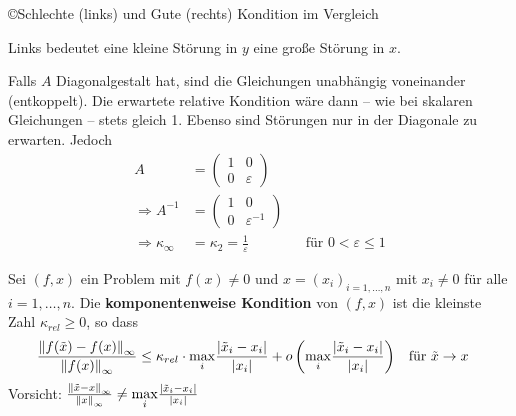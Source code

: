 \begin{Bspe}
\begin{image}{\copyright Schlechte (links) und Gute (rechts)
      Kondition im Vergleich}
    Links bedeutet eine kleine Störung in $y$ eine große Störung in $x$.
  \end{image}
\end{Bspe}



\begin{Bspe}
  Falls $A$ Diagonalgestalt hat, sind die Gleichungen 
  unabhängig voneinander (entkoppelt).
  Die erwartete relative Kondition wäre dann 
  – wie bei skalaren Gleichungen – stets gleich 1.
  Ebenso sind Störungen nur in der Diagonale zu erwarten. Jedoch
  \begin{align*}
    A  &=\begin{pmatrix}
      1 & 0\\
      0 & \varepsilon
    \end{pmatrix} \\
    \Rightarrow 	A^{-1}&=\begin{pmatrix}
      1 & 0\\
      0 & \varepsilon^{-1}
    \end{pmatrix}\\
    \Rightarrow \kappa_\infty& = \kappa_2 = \frac{1}{\varepsilon} 
        && \text{für }0 < \varepsilon \leq 1
  \end{align*}
\end{Bspe}

\begin{Defe}
  Sei $(f, x) $ ein Problem mit $f(x)\neq 0$ 
  und $x=(x_i)_{i=1,\dotsc , n}$ mit $x_i\neq 0 $  für alle $i=1,\dotsc, n$.
  Die \textbf{komponentenweise Kondition} von $(f,x)$
  ist die kleinste Zahl $\kappa_{rel}\geq 0$, so dass
  \begin{align*}
    \frac{\nn[f(\tilde{x})-f(x)]_\infty}{\nn[f(x)]_\infty} 
    &\leq \kappa_{rel} 
      \cdot \underset{i}{\max}
      \frac{|\tilde{x}_i-x_i|}{|x_i|}
      + o\left(\underset{i}{\max}\frac{|\tilde{x}_i-x_i|}{|x_i|}\right) 
    && \text{für }\tilde{x}\to x
  \end{align*}
  Vorsicht:
  $
  \frac{\nn[\tilde{x}-x]_\infty}{\nn[x]_\infty}
  \neq \underset{i}{\max}\frac{|\tilde{x}_i-x_i|}{|x_i|}
  $
\end{Defe}

